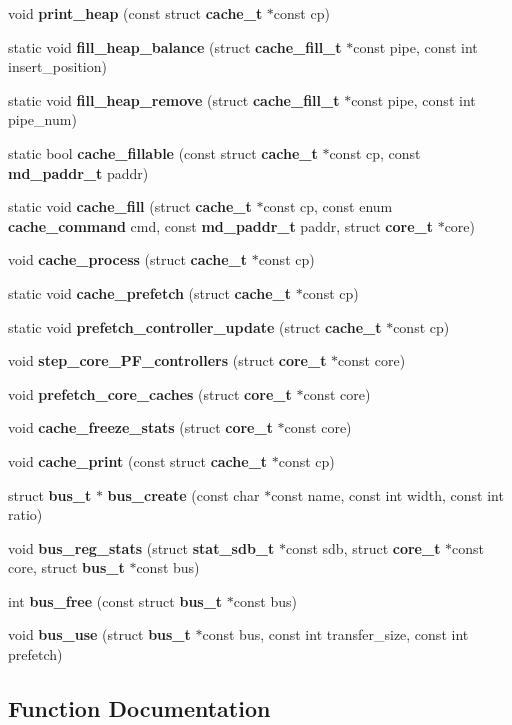 \begin{CompactItemize}
void {\bf print\_\-heap} (const struct {\bf cache\_\-t} $\ast$const cp)
\item 
static void {\bf fill\_\-heap\_\-balance} (struct {\bf cache\_\-fill\_\-t} $\ast$const pipe, const int insert\_\-position)
\item 
static void {\bf fill\_\-heap\_\-remove} (struct {\bf cache\_\-fill\_\-t} $\ast$const pipe, const int pipe\_\-num)
\item 
static bool {\bf cache\_\-fillable} (const struct {\bf cache\_\-t} $\ast$const cp, const {\bf md\_\-paddr\_\-t} paddr)
\item 
static void {\bf cache\_\-fill} (struct {\bf cache\_\-t} $\ast$const cp, const enum {\bf cache\_\-command} cmd, const {\bf md\_\-paddr\_\-t} paddr, struct {\bf core\_\-t} $\ast$core)
\item 
void {\bf cache\_\-process} (struct {\bf cache\_\-t} $\ast$const cp)
\item 
static void {\bf cache\_\-prefetch} (struct {\bf cache\_\-t} $\ast$const cp)
\item 
static void {\bf prefetch\_\-controller\_\-update} (struct {\bf cache\_\-t} $\ast$const cp)
\item 
void {\bf step\_\-core\_\-PF\_\-controllers} (struct {\bf core\_\-t} $\ast$const core)
\item 
void {\bf prefetch\_\-core\_\-caches} (struct {\bf core\_\-t} $\ast$const core)
\item 
void {\bf cache\_\-freeze\_\-stats} (struct {\bf core\_\-t} $\ast$const core)
\item 
void {\bf cache\_\-print} (const struct {\bf cache\_\-t} $\ast$const cp)
\item 
struct {\bf bus\_\-t} $\ast$ {\bf bus\_\-create} (const char $\ast$const name, const int width, const int ratio)
\item 
void {\bf bus\_\-reg\_\-stats} (struct {\bf stat\_\-sdb\_\-t} $\ast$const sdb, struct {\bf core\_\-t} $\ast$const core, struct {\bf bus\_\-t} $\ast$const bus)
\item 
int {\bf bus\_\-free} (const struct {\bf bus\_\-t} $\ast$const bus)
\item 
void {\bf bus\_\-use} (struct {\bf bus\_\-t} $\ast$const bus, const int transfer\_\-size, const int prefetch)
\end{CompactItemize}


\subsection{Function Documentation}
